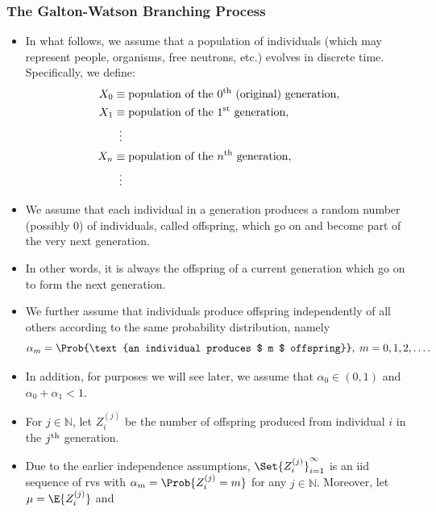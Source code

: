 \subsubsection{The Galton-Watson Branching Process}
\begin{itemize}
      \item In what follows, we assume that a population of individuals (which may represent people,
            organisms, free neutrons, etc.) evolves in discrete time. Specifically, we define:
            \begin{align*}
                  X_0 & \equiv \text{population of the $0\textsuperscript{th}$ (original) generation}, \\
                  X_1 & \equiv \text{population of the $1\textsuperscript{st}$ generation},            \\
                      & \vdotswithin{\equiv}                                                           \\
                  X_n & \equiv \text{population of the $n\textsuperscript{th}$ generation},            \\
                      & \vdotswithin{\equiv}
            \end{align*}
      \item We assume that each individual in a generation produces a random number (possibly $0$) of
            individuals, called offspring, which go on and become part of the very next generation.
      \item In other words, it is always the offspring of a current generation which go on to form the next
            generation.
      \item We further assume that individuals produce offspring independently of all others according to
            the same probability distribution, namely
            \[ \alpha_m=\Prob{\text{an individual produces $ m $ offspring}},\; m=0,1,2,\ldots. \]
      \item In addition, for purposes we will see later, we assume that $ \alpha_0\in(0,1) $ and $ \alpha_0+\alpha_1<1 $.
      \item For $ j\in\mathbb{N} $, let $ Z_i^{(j)} $ be the number of offspring produced from individual $ i $ in the
            $ j\textsuperscript{th} $ generation.
      \item Due to the earlier independence assumptions, $ \Set{Z_i^{(j)}}_{i=1}^\infty $ is an iid sequence of rvs with
            $ \alpha_m=\Prob{Z_i^{(j)}=m} $ for any $ j\in\mathbb{N} $. Moreover, let $ \mu=\E{Z_i^{(j)}} $ and

\end{itemize}
